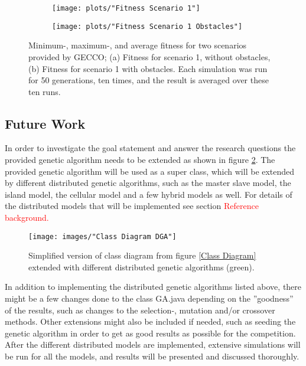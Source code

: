 \begin{figure}[h!]
    \centering
    \begin{subfigure}[b]{0.45\textwidth}
        \texttt{[image: plots/"Fitness Scenario 1"]}
        \caption{}
    \end{subfigure}
    \begin{subfigure}[b]{0.45\textwidth}
        \texttt{[image: plots/"Fitness Scenario 1 Obstacles"]}
        \caption{}
    \end{subfigure}
    \caption{Minimum-, maximum-, and average fitness for two scenarios provided by GECCO; (a) Fitness for scenario 1, without obstacles, (b) Fitness for scenario 1 with obstacles. Each simulation was run for 50 generations, ten times, and the result is averaged over these ten runs.}
    \label{Test Plots}
\end{figure}


\subsection{Future Work}


In order to investigate the goal statement and answer the research questions the provided genetic algorithm needs to be extended as shown in figure \ref{Class Diagram DGA}. The provided genetic algorithm will be used as a super class, which will be extended by different distributed genetic algorithms, such as the master slave model, the island model, the cellular model and a few hybrid models as well. For details of the distributed models that will be implemented see section \textcolor{red}{Reference background.}\\


\begin{figure}[h!]
\begin{center}
\texttt{[image: images/"Class Diagram DGA"]}
\caption{Simplified version of class diagram from figure \ref{Class Diagram} extended with different distributed genetic algorithms (green).}
\label{Class Diagram DGA}
\end{center}
\end{figure}


\noindent In addition to implementing the distributed genetic algorithms listed above, there might be a few changes done to the class GA.java depending on the ''goodness'' of the results, such as changes to the selection-, mutation and/or crossover methods. Other extensions might also be included if needed, such as seeding the genetic algorithm in order to get as good results as possible for the competition.\\

\noindent After the different distributed models are implemented, extensive simulations will be run for all the models, and results will be presented and discussed thoroughly. 

